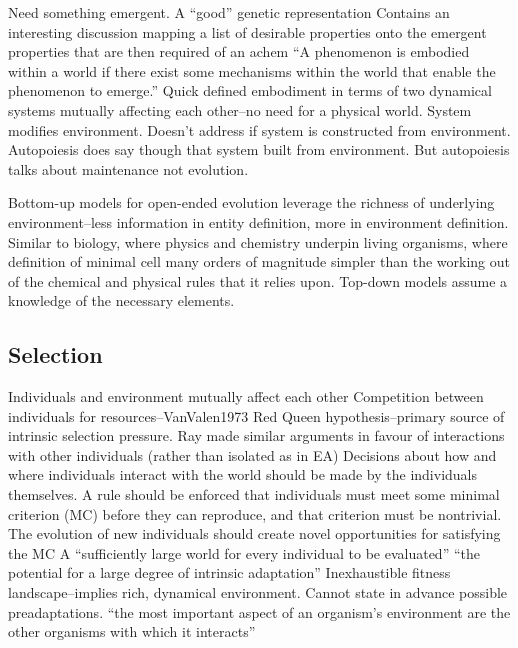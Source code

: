 \begin{NOTES}
Need something emergent. \parencite{Nellis2014}
A ``good'' genetic representation \parencite{Soros2014}
Contains an interesting discussion mapping a list of desirable properties onto the emergent properties that are then required of an \gls{achem} \parencite{Faulconbridge2010, Faulconbridge2011}
``A phenomenon is embodied within a world if there exist some mechanisms within the world that enable the phenomenon to emerge.'' \cite{Nellis2014}
Quick defined embodiment in terms of two dynamical systems mutually affecting each other--no need for a physical world. System modifies environment. Doesn't address if system is constructed from environment. Autopoiesis does say though that system built from environment. But autopoiesis talks about maintenance not evolution. \parencite{Nellis2014}

Bottom-up models for open-ended evolution leverage the richness of underlying environment--less information in entity definition, more in environment definition. Similar to biology, where physics and chemistry underpin living organisms, where definition of minimal cell many orders of magnitude simpler than the working out of the chemical and physical rules that it relies upon. Top-down models assume a knowledge of the necessary elements.
\end{NOTES}

\subsection{Selection}
\begin{NOTES}
Individuals and environment mutually affect each other \parencite{Taylor2001}
Competition between individuals for resources--VanValen1973 Red Queen hypothesis--primary source of intrinsic selection pressure. \parencite{Taylor2001}
Ray made similar arguments in favour of interactions with other individuals (rather than isolated as in EA) 
Decisions about how and where individuals interact with the world should be made by the individuals themselves. \parencite{Soros2014}
A rule should be enforced that individuals must meet some minimal criterion (MC) before they can reproduce, and that criterion must be nontrivial.\parencite{Soros2014}
The evolution of new individuals should create novel opportunities for satisfying the MC \parencite{Soros2014}
A ``sufficiently large world for every individual to be evaluated'' \parencite{Soros2014}
``the potential for a large degree of intrinsic adaptation'' \parencite{Taylor2001}
Inexhaustible fitness landscape--implies rich, dynamical environment. \parencite{Vasas2015}
Cannot state in advance possible preadaptations. \parencite{Vasas2015}
``the most important aspect of an organism's environment are the other organisms with which it interacts'' \parencite{Maley1999}
\end{NOTES}

